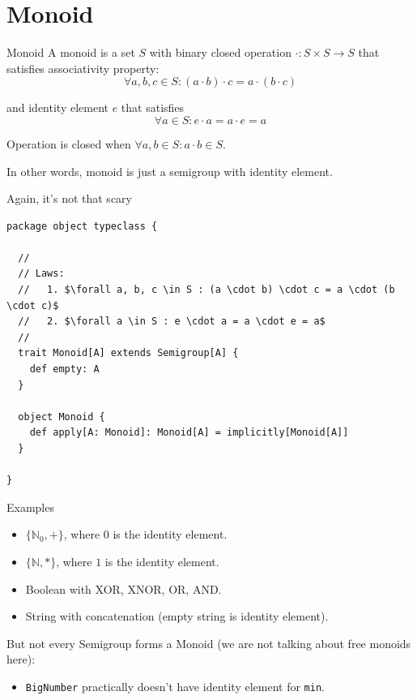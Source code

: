 \documentclass[presentation,aspectratio=169,smaller]{beamer}
\begin{document}
\section*{Monoid}
\label{sec:org431cce2}

\begin{frame}[label={sec:org8f4438c}]{Monoid}
A monoid is a set \(S\) with binary closed operation \(\cdot : S \times S
\rightarrow S\) that satisfies associativity property:
$$\forall a, b, c \in S : (a \cdot b) \cdot c = a \cdot (b \cdot c)$$

and identity element \(e\) that satisfies
$$\forall a \in S : e \cdot a = a \cdot e = a$$

Operation is closed when \(\forall a, b \in S : a \cdot b \in S\).

\pause

In other words, monoid is just a semigroup with identity element.
\end{frame}

\begin{frame}[label={sec:org8d92b72},fragile]{Again, it's not that scary}
 \begin{verbatim}
package object typeclass {

  //
  // Laws:
  //   1. $\forall a, b, c \in S : (a \cdot b) \cdot c = a \cdot (b \cdot c)$
  //   2. $\forall a \in S : e \cdot a = a \cdot e = a$
  //
  trait Monoid[A] extends Semigroup[A] {
    def empty: A
  }

  object Monoid {
    def apply[A: Monoid]: Monoid[A] = implicitly[Monoid[A]]
  }

}
\end{verbatim}
\end{frame}

\begin{frame}[label={sec:orgbebb487},fragile]{Examples}
 \begin{itemize}
\item \(\{\mathbb{N}_0, +\}\), where \(0\) is the identity element.
\item \(\{\mathbb{N}, *\}\), where \(1\) is the identity element.
\item Boolean with XOR, XNOR, OR, AND.
\item String with concatenation (empty string is identity element).
\end{itemize}

\pause

But not every Semigroup forms a Monoid (we are not talking about free monoids
here):

\begin{itemize}
\item \texttt{BigNumber} practically doesn’t have identity element for \texttt{min}.
\end{itemize}
\end{frame}
\end{document}

